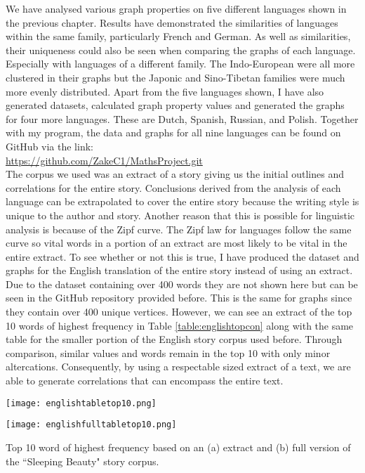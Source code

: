 We have analysed various graph properties on five different languages shown in the previous chapter. Results have demonstrated the similarities of languages within the same family, particularly French and German. As well as similarities, their uniqueness could also be seen when comparing the graphs of each language. Especially with languages of a different family. The Indo-European were all more clustered in their graphs but the Japonic and Sino-Tibetan families were much more evenly distributed. Apart from the five languages shown, I have also generated datasets, calculated graph property values and generated the graphs for four more languages. These are Dutch, Spanish, Russian, and Polish. Together with my program, the data and graphs for all nine languages can be found on GitHub via the link:\\

\url{https://github.com/ZakeC1/MathsProject.git}\\

The corpus we used was an extract of a story giving us the initial outlines and correlations for the entire story. Conclusions derived from the analysis of each language can be extrapolated to cover the entire story because the writing style is unique to the author and story. Another reason that this is possible for linguistic analysis is because of the Zipf curve. The Zipf law for languages follow the same curve so vital words in a portion of an extract are most likely to be vital in the entire extract. To see whether or not this is true, I have produced the dataset and graphs for the English translation of the entire story instead of using an extract. Due to the dataset containing over 400 words they are not shown here but can be seen in the GitHub repository provided before. This is the same for graphs since they contain over 400 unique vertices. However, we can see an extract of the top 10 words of highest frequency in Table \ref{table:englishtopcon} along with the same table for the smaller portion of the English story corpus used before. Through comparison, similar values and words remain in the top 10 with only minor altercations. Consequently, by using a respectable sized extract of a text, we are able to generate correlations that can encompass the entire text.

\begin{table}[!htb]
\centering
\begin{subtable}{.45\textwidth}
	\centering
	\texttt{[image: englishtabletop10.png]}
	\caption{}
\end{subtable}
\hfill
\begin{subtable}{.45\textwidth}
	\centering
	\texttt{[image: englishfulltabletop10.png]}
	\caption{}
\end{subtable}
\caption{Top 10 word of highest frequency based on an (a) extract and (b) full version of the ``Sleeping Beauty" story corpus.}
\label{table:englishtopcon}
\end{table}


